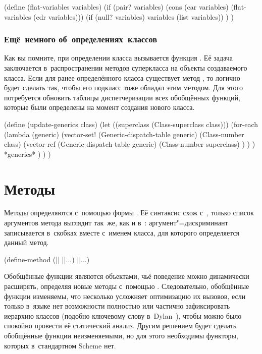 \begin{code:lisp}
(define (flat-variables variables)
  (if (pair? variables)
      (cons (car variables) (flat-variables (cdr variables)))
      (if (null? variables) variables (list variables)) ) )
\end{code:lisp}


\subsubsection{Ещё~немного об~определениях~классов}%
\label{objects/generics/sssect:class-def}

Как вы помните, при определении класса вызывается функция .
Её задача заключается в~распространении методов суперкласса на объекты
создаваемого класса. Если для ранее определённого класса  существует
метод , то логично будет сделать так, чтобы его подкласс
 тоже обладал этим методом. Для этого потребуется обновить
таблицы диспетчеризации всех обобщённых функций, которые были определены на
момент создания нового класса.

\begin{code:lisp}
(define (update-generics class)
  (let ((superclass (Class-superclass class)))
    (for-each
     (lambda (generic)
       (vector-set! (Generic-dispatch-table generic)
                    (Class-number class)
                    (vector-ref (Generic-dispatch-table generic)
                                (Class-number superclass) ) ) )
     *generics* ) ) )
\end{code:lisp}


\section{Методы}\label{objects/sect:method}

Методы определяются с~помощью формы . Её синтаксис схож
с~, только список аргументов метода выглядит так~же, как и
в~: аргумент"=дискриминант записывается в~скобках вместе
с~именем класса, для которого определяется данный метод.

\begin{code:lisp}
(define-method (|| ||...) ||...)
\end{code:lisp}

Обобщённые функции являются объектами, чьё поведение можно динамически
расширять, определяя новые методы с~помощью . Следовательно,
обобщённые функции изменяемы, что несколько усложняет оптимизацию их вызовов,
если только в~языке нет возможности полностью или частично зафиксировать
иерархию классов (подобно ключевому слову  в~Dylan~\cite{app92b}),
чтобы можно было спокойно провести её статический анализ. Другим решением будет
сделать обобщённые функции неизменяемыми, но для этого необходимы функторы,
которых в~стандартном Scheme нет.


